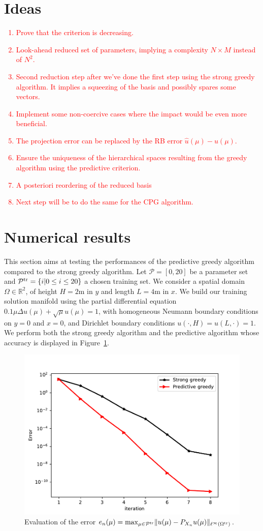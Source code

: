 \documentclass[12pt,a4paper]{article}
\newcommand\red[1]{\textcolor{red} {#1} }
\begin{document}
\section{Ideas}
\red{
\begin{enumerate}
\item Prove that the criterion is decreasing.
\item Look-ahead reduced set of parameters, implying a complexity $N\times M$ instead of $N^2$.
\item Second reduction step after we've done the first step using the strong greedy algorithm. It implies a squeezing of the basis and possibly spares some vectors.
\item Implement some non-coercive cases where the impact would be even more beneficial.
\item The projection error can be replaced by the RB error $\hat u(\mu) - u(\mu).$
\item Ensure the uniqueness of the hierarchical spaces resulting from the greedy algorithm using the predictive criterion.
\item A posteriori reordering of the reduced basis
\item Next step will be to do the same for the CPG algorithm.
\end{enumerate}
}

\section{Numerical results}
This section aims at testing the performances of the predictive greedy algorithm compared to the strong greedy algorithm.
Let $\mathcal P = [0,20]$ be a parameter set and $\mathcal P^{\rm tr}=\{i|0\leq i\leq 20\}$ a chosen training set.
We consider a spatial domain $\Omega\in\mathbb R^2$,  of height $H = 2$m in $y$ and length $L=4$m in $x$.
We build our training solution manifold using the partial differential equation $0.1\mu\Delta u(\mu)+\sqrt{\mu}u(\mu) = 1$, with homogeneous Neumann boundary conditions on $y = 0$ and $x = 0$, and Dirichlet boundary conditions $u(\cdot,H) = u(L,\cdot) = 1$. We perform both the strong greedy algorithm and the predictive algorithm whose accuracy is displayed in Figure~\ref{fig:err}.
\begin{figure}
\centering
\includegraphics[width=.6\textwidth]{images/error_sg_pg.pdf}
\caption{Evaluation of the error 
$e_n(\mu) = {\max}_{\mu\in\mathcal P^{\rm tr}}\|u(\mu)-P_{X_n}u(\mu)\|_{\ell^\infty(\Omega^{\rm tr})}$.}
\label{fig:err}
\end{figure}



\end{document}
